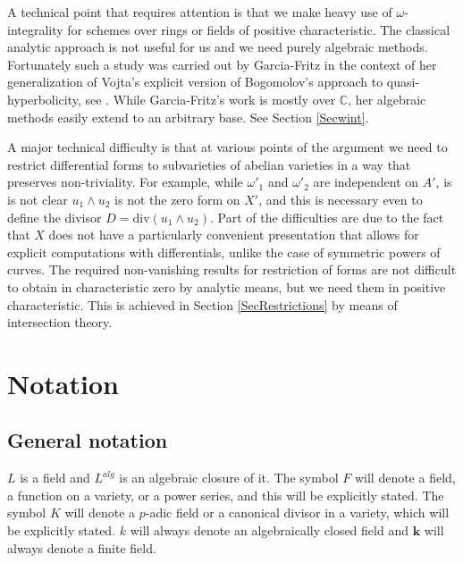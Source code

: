 \documentclass[11pt]{amsart}
\theoremstyle{remark}
\numberwithin{equation}{section}
\newcommand{\C}{\mathbb{C}}
\newcommand{\kk}{\mathbf{k}}
\newcommand{\divi}{\mathrm{div}}
\begin{document}
A technical point that requires attention is that we make heavy use of $\omega$-integrality for schemes over  rings or fields of positive characteristic. The classical analytic approach is not useful for us and we need purely algebraic methods. Fortunately such a study was carried out by Garcia-Fritz \cite{GFthesis, GFtams, GFijnt} in the context of her generalization of Vojta's explicit version of Bogomolov's approach to quasi-hyperbolicity, see \cite{VojtaBuchi, Deschamps}. While Garcia-Fritz's work is mostly over $\C$, her algebraic methods easily extend to an arbitrary base. See Section \ref{Secwint}. 

A major technical difficulty is that at various points of the argument we need to restrict differential forms to subvarieties of abelian varieties in a way that preserves non-triviality. For example, while $\omega'_1$ and $\omega'_2$ are independent on $A'$, is is not clear $u_1\wedge u_2$ is not the zero form on $X'$, and this is necessary even to define the divisor $D=\divi(u_1\wedge u_2)$. Part of the difficulties are due to the fact that $X$ does not have a particularly convenient presentation that allows for explicit computations with differentials, unlike the case of symmetric powers of curves. The required non-vanishing results for restriction of forms are not difficult to obtain in characteristic zero by analytic means, but we need them in positive characteristic. This is achieved in Section \ref{SecRestrictions} by means of intersection theory. 












\section{Notation}


\subsection{General notation}\label{NotationFields} $L$ is a field and $L^{alg}$ is an algebraic closure of it. The symbol $F$ will denote a field, a function on a variety, or a power series, and this will be explicitly stated.  The symbol $K$ will denote a $p$-adic field or a canonical divisor in a variety, which will be explicitly stated.  $k$ will always denote an algebraically closed field and $\kk$ will always denote a finite field. 
\end{document}
